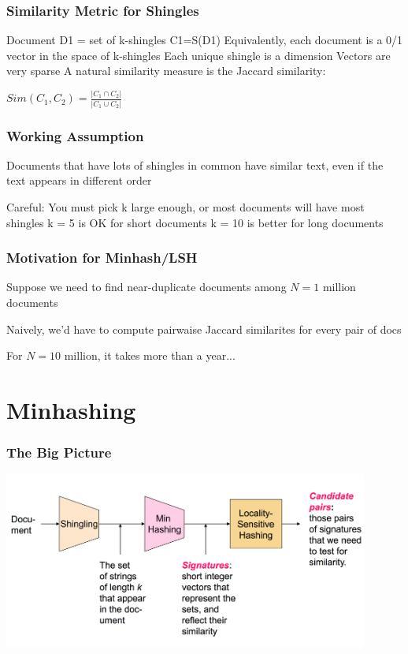 \documentclass[svgnames]{beamer}
\begin{document}
  
\begin{frame} \frametitle{Similarity Metric for Shingles}


Document D1 = set of k-shingles C1=S(D1)
Equivalently, each document is a 0/1 vector in the space of k-shingles
   Each unique shingle is a dimension
    Vectors are very sparse
A natural similarity measure is the Jaccard similarity:

$Sim(C_1, C_2) = \frac{|C_1 \cap C_2|}{|C_1 \cup C_2|}$

\end{frame}

  
\begin{frame} \frametitle{Working Assumption}

Documents that have lots of shingles in common have similar text, even if the text appears in different order

Careful: You must pick k large enough, or most documents will have most shingles
   k = 5 is OK for short documents
   k = 10 is better for long documents

\end{frame}

  
\begin{frame} \frametitle{Motivation for Minhash/LSH}
Suppose we need to find near-duplicate documents among $N=1$ million documents

Naively, we'd have to compute pairwaise Jaccard similarites for every pair of docs

For $N = 10$ million, it takes more than a year...
\end{frame}

\section{Minhashing}

  
\begin{frame} \frametitle{The Big Picture}

\includegraphics[width=12cm]{overall}

\end{frame}
\end{document}
